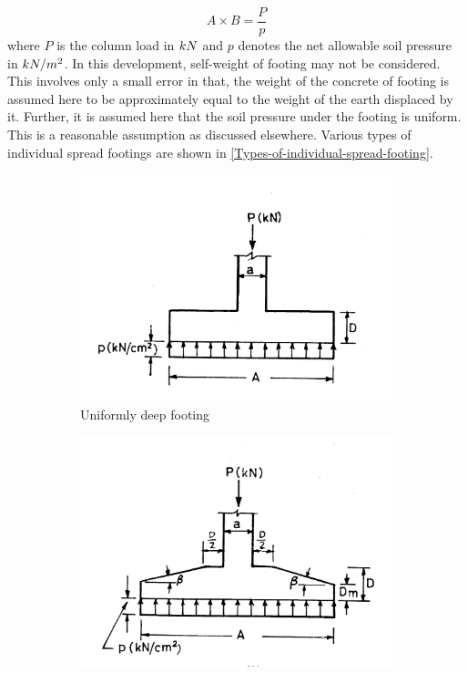 \begin{equation}
\label{eq:footingArea}
A \times B = \frac{P}{p}
\end{equation}
where $P$ is the column load in $\kNmacro$ and $p$ denotes the net allowable
soil pressure in $\kNmsquaremacro$. In this development, self-weight of footing
may not be considered. This involves only a small error in that, the
weight of the concrete of footing is assumed here to be approximately
equal to the weight of the earth displaced by it. Further, it is assumed
here that the soil pressure under the footing is uniform. This is a 
reasonable assumption as discussed elsewhere. Various types of 
individual spread footings are shown in
\figmacro \ref{Types-of-individual-spread-footing}.
\begin{figure}
\begin{subfigure}[b]{0.5\textwidth}
  \includegraphics[width=\textwidth]{images/fig2291.png}
    \caption{Uniformly deep footing}
    \label{uniformdeepfooting}
  \end{subfigure}
  \begin{subfigure}[b]{0.5\textwidth}
    \includegraphics[width=\textwidth]{images/fig2292.png}

\end{subfigure}
\end{figure}
